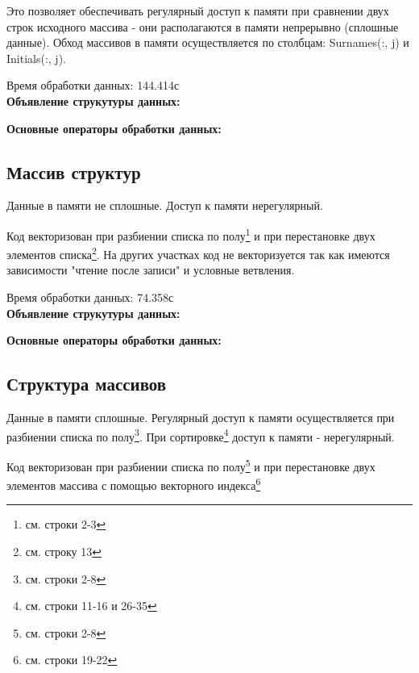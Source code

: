 \documentclass[a4paper, 12pt] {article}
\begin{document}
  Это позволяет обеспечивать регулярный доступ к памяти при сравнении
двух строк исходного массива - они располагаются в памяти непрерывно
(сплошные данные). 
Обход массивов в памяти осуществляется по столбцам: Surnames(:, j) и
Initials(:, j). 

  Время обработки данных: 144.414с\bigskip\\

{\bfseries{\large Объявление струкутуры данных:}}
 

\newpage
{\bfseries{\large Основные операторы обработки данных:}}
 

\newpage
\subsection{Массив структур}

  Данные в памяти не сплошные. Доступ к памяти нерегулярный.

  Код векторизован при разбиении списка по полу\footnote{см. строки
  2-3} и при перестановке двух элементов списка\footnote{см. строку
  13}. На других участках код не векторизуется так как имеются
  зависимости "чтение после записи" и условные ветвления.

  Время обработки данных: 74.358с\bigskip\\

{\bfseries{\large Объявление струкутуры данных:}}
 

\newpage
{\bfseries{\large Основные операторы обработки данных:}}
 

\newpage
\subsection{Структура массивов}

  Данные в памяти сплошные. Регулярный доступ к памяти осуществляется при разбиении списка по
полу\footnote{см. строки 2-8}. При сортировке\footnote{см. строки
11-16 и 26-35} доступ к памяти - нерегулярный.

  Код векторизован при разбиении списка по полу\footnote{см. строки
2-8} и при перестановке двух элементов массива с помощью векторного
индекса\footnote{см. строки 19-22}
\end{document}
